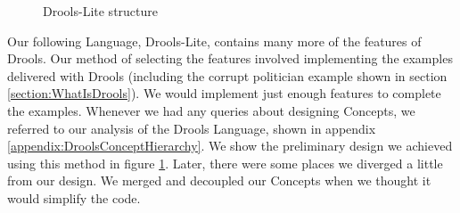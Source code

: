 \begin{figure}
    \centering
    \caption{Drools-Lite structure}
    \label{fig:DroolsLiteDiagram}
\end{figure}
 
Our following Language, Drools-Lite, contains many more of the features of Drools.
Our method of selecting the features involved implementing the examples delivered with Drools (including the corrupt politician example shown in section \ref{section:WhatIsDrools}).
We would implement just enough features to complete the examples.
Whenever we had any queries about designing Concepts, we referred to our analysis of the Drools Language, shown in appendix \ref{appendix:DroolsConceptHierarchy}.
We show the preliminary design we achieved using this method in figure \ref{fig:DroolsLiteDiagram}.
Later, there were some places we diverged a little from our design.
We merged and decoupled our Concepts when we thought it would simplify the code.

